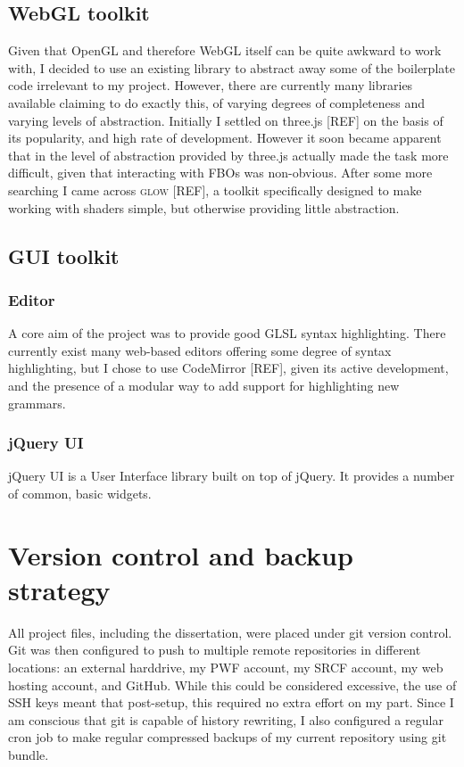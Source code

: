 \documentclass[12pt,twoside,notitlepage]{report}
\begin{document}
\subsection{WebGL toolkit}
Given that OpenGL and therefore WebGL itself can be quite awkward to work with, I decided to use an existing library to abstract away some of the boilerplate code irrelevant to my project. However, there are currently many libraries available claiming to do exactly this, of varying degrees of completeness and varying levels of abstraction. Initially I settled on three.js [REF] on the basis of its popularity, and high rate of development. However it soon became apparent that in the level of abstraction provided by three.js actually made the task more difficult, given that interacting with FBOs was non-obvious. After some more searching I came across \textsc{glow} [REF], a toolkit specifically designed to make working with shaders simple, but otherwise providing little abstraction.

\subsection{GUI toolkit}
\subsubsection{Editor}
A core aim of the project was to provide good GLSL syntax highlighting. There currently exist many web-based editors offering some degree of syntax highlighting, but I chose to use CodeMirror [REF], given its active development, and the presence of a modular way to add support for highlighting new grammars. 

\subsubsection{jQuery UI}
jQuery UI is a User Interface library built on top of jQuery. It provides a number of common, basic widgets.

\section{Version control and backup strategy}
All project files, including the dissertation, were placed under git version control. Git was then configured to push to multiple remote repositories in different locations: an external harddrive, my PWF account, my SRCF account, my web hosting account, and GitHub. While this could be considered excessive, the use of SSH keys meant that post-setup, this required no extra effort on my part. Since I am conscious that git is capable of history rewriting, I also configured a regular cron job to make regular compressed backups of my current repository using git bundle.
\end{document}
